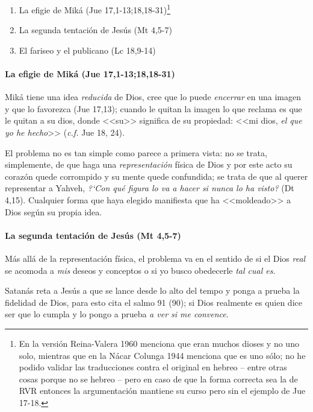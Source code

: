 \begin{enumerate}
\item La efigie de Mik\'a (Jue 17,1-13;18,18-31)\footnote{En la versi\'on Reina-Valera 1960 menciona que eran muchos dioses y no uno solo, mientras que en la N\'acar Colunga 1944 menciona que es uno s\'olo; no he podido validar las traducciones contra el original en hebreo -- entre otras cosas porque no se hebreo -- pero en caso de que la forma correcta sea la de RVR entonces la argumentaci\'on mantiene su curso pero sin el ejemplo de Jue 17-18.}
\item La segunda tentaci\'on de Jes\'us (Mt 4,5-7)
\item El fariseo y el publicano (Lc 18,9-14)
\end{enumerate}

\paragraph{La efigie de Mik\'a (Jue 17,1-13;18,18-31)}

Mik\'a tiene una idea \emph{reducida} de Dios, cree que lo puede \emph{encerrar} en una imagen y que lo favorezca (Jue 17,13); cuando le quitan la imagen lo que reclama es que le quitan a su dios, donde <<su>> significa de su propiedad: <<mi dios, \emph{el que yo he hecho}>> (\emph{c.f.} Jue 18, 24).

El problema no es tan simple como parece a primera vista: no se trata, simplemente, de que haga una \emph{representaci\'on} f\'{i}sica de Dios y por este acto su coraz\'on quede corrompido y su mente quede confundida; se trata de que al querer representar a Yahveh, \emph{?`Con qu\'e figura lo va a hacer si nunca lo ha visto?} (Dt 4,15). Cualquier forma que haya elegido manifiesta que ha <<moldeado>> a Dios seg\'un su propia idea.

\paragraph{La segunda tentaci\'on de Jes\'us (Mt 4,5-7)}

M\'as all\'a de la representaci\'on f\'{i}sica, el problema va en el sentido de si el Dios \emph{real} se acomoda a \emph{mis} deseos y conceptos o si yo busco obedecerle \emph{tal cual es}.

Satan\'as reta a Jes\'us a que se lance desde lo alto del tempo y ponga a prueba la fidelidad de Dios, para esto cita el salmo 91 (90); si Dios realmente es quien dice ser que lo cumpla y lo pongo a prueba \emph{a ver si me convence}.

